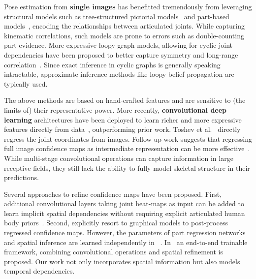 \documentclass[10pt,twocolumn,letterpaper]{article}
\newcommand{\note}[3]{{\color{#2}[#1: #3]}}
\newcommand{\OH}[1]{\note{O}{red}{#1}}
\begin{document}
Pose estimation from \textbf{single images} has benefitted tremendously from leveraging structural models such as tree-structured pictorial models~\cite{andriluka2009pictorial} and part-based models~\cite{johnson2010clustered,pishchulin2013poselet,ramanan2006learning,yang2011articulated}, encoding the relationships between articulated joints. While capturing kinematic correlations, such models are prone to errors such as double-counting part evidence.
More expressive loopy graph models, allowing for cyclic joint dependencies have been proposed to better capture symmetry and long-range correlation~\cite{dantone2013human,ren2005recovering,sigal2006measure,sun2011articulated}. Since exact inference in cyclic graphs is generally speaking intractable, approximate inference methods like loopy belief propagation are typically used. %

The above methods are based on hand-crafted features and are sensitive to (the limits of) their representative power. More recently, \textbf{convolutional deep learning} architectures have been deployed to learn richer and more expressive features directly from data~\cite{chen2014articulated,ouyang2014multi,tompson2014joint,pishchulin2015deepcut,toshev2014deeppose}, outperforming prior work. Toshev et al.~\cite{toshev2014deeppose} directly regress the joint coordinates from images. Follow-up work suggests that regressing full image confidence maps as intermediate representation can be more effective~\cite{tompson2014joint,chen2014articulated}. While multi-stage convolutional operations can capture information in large receptive fields, they still lack the ability to fully model skeletal structure in their predictions.

Several approaches to refine confidence maps have been proposed.
First, additional convolutional layers taking joint heat-maps as input can be added to learn implicit spatial dependencies without requiring explicit articulated human body priors~\cite{tompson2014joint,wei2016cpm,chu2016structure}.
Second, \cite{pishchulin2015deepcut,chen2014articulated} explicitly resort to graphical models to post-process regressed confidence maps.
However, the parameters of part regression networks and spatial inference are learned independently in ~\cite{chen2014articulated,pishchulin2015deepcut}. In~\cite{yang2016end} an end-to-end trainable framework, combining convolutional operations and spatial refinement is proposed. Our work not only incorporates spatial information but also models temporal dependencies.
\end{document}
